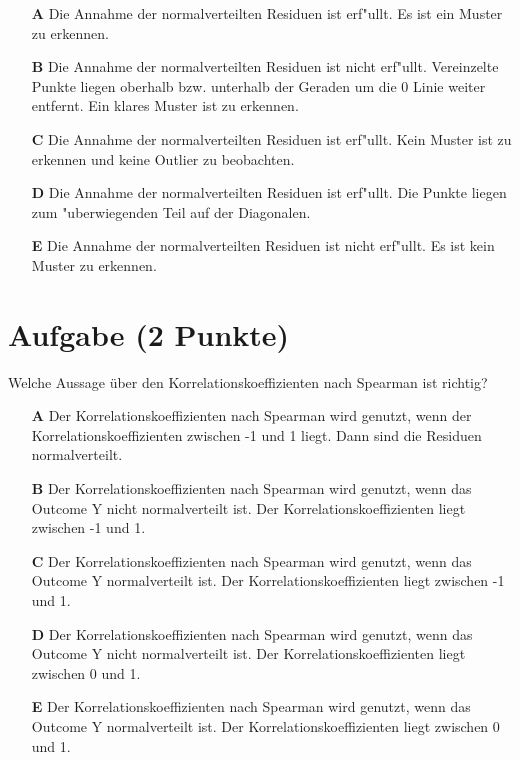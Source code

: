 \documentclass[a4paper, 9pt]{scrartcl}\usepackage[]{graphicx}\usepackage[]{xcolor}
\begin{document}
\begin{enumerate}
\item [\textbf{A} \msquare] Die Annahme der normalverteilten Residuen ist erf{"u}llt. Es ist ein Muster zu erkennen.
\item [\textbf{B} \msquare] Die Annahme der normalverteilten Residuen ist nicht erf{"u}llt. Vereinzelte Punkte liegen oberhalb bzw. unterhalb der Geraden um die 0 Linie weiter entfernt. Ein klares Muster ist zu erkennen.
\item [\textbf{C} \msquare] Die Annahme der normalverteilten Residuen ist erf{"u}llt. Kein Muster ist zu erkennen und keine Outlier zu beobachten.
\item [\textbf{D} \msquare] Die Annahme der normalverteilten Residuen ist erf{"u}llt. Die Punkte liegen zum {"u}berwiegenden Teil auf der Diagonalen.
\item [\textbf{E} \msquare] Die Annahme der normalverteilten Residuen ist nicht erf{"u}llt. Es ist kein Muster zu erkennen.
\end{enumerate}

\section{Aufgabe \hfill (2 Punkte)}




Welche Aussage {\"u}ber den Korrelationskoeffizienten nach Spearman
ist richtig?



\begin{enumerate}
\item [\textbf{A} \msquare] Der Korrelationskoeffizienten nach Spearman wird genutzt, wenn der Korrelationskoeffizienten zwischen -1 und 1 liegt. Dann sind die Residuen normalverteilt.
\item [\textbf{B} \msquare] Der Korrelationskoeffizienten nach Spearman wird genutzt, wenn das Outcome Y nicht normalverteilt ist. Der Korrelationskoeffizienten liegt zwischen -1 und 1.
\item [\textbf{C} \msquare] Der Korrelationskoeffizienten nach Spearman wird genutzt, wenn das Outcome Y normalverteilt ist. Der Korrelationskoeffizienten liegt zwischen -1 und 1.
\item [\textbf{D} \msquare] Der Korrelationskoeffizienten nach Spearman wird genutzt, wenn das Outcome Y nicht normalverteilt ist. Der Korrelationskoeffizienten liegt zwischen 0 und 1.
\item [\textbf{E} \msquare] Der Korrelationskoeffizienten nach Spearman wird genutzt, wenn das Outcome Y normalverteilt ist. Der Korrelationskoeffizienten liegt zwischen 0 und 1.
\end{enumerate}
\end{document}
